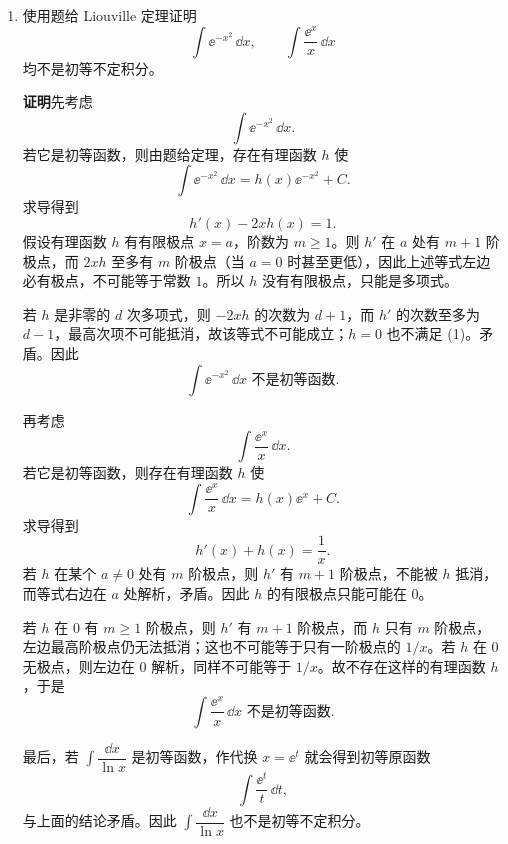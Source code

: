 \begin{enumerate}
  \item 使用题给 Liouville 定理证明
  \[
    \int\ee^{-x^2}\,\dd x,
    \qquad
    \int\frac{\ee^x}{x}\,\dd x
  \]
  均不是初等不定积分。

  \textbf{证明}\quad 先考虑
  \[
    \int\ee^{-x^2}\,\dd x.
  \]
  若它是初等函数，则由题给定理，存在有理函数 $h$ 使
  \[
    \int\ee^{-x^2}\,\dd x=h(x)\ee^{-x^2}+C.
  \]
  求导得到
  \[
    h'(x)-2xh(x)=1.
  \]
  假设有理函数 $h$ 有有限极点 $x=a$，阶数为 $m\ge1$。则 $h'$ 在 $a$ 处有 $m+1$ 阶极点，而 $2xh$ 至多有 $m$ 阶极点（当 $a=0$ 时甚至更低），因此上述等式左边必有极点，不可能等于常数 $1$。所以 $h$ 没有有限极点，只能是多项式。

  若 $h$ 是非零的 $d$ 次多项式，则 $-2xh$ 的次数为 $d+1$，而 $h'$ 的次数至多为 $d-1$，最高次项不可能抵消，故该等式不可能成立；$h=0$ 也不满足 (1)。矛盾。因此
  \[
    \boxed{\int\ee^{-x^2}\,\dd x\text{ 不是初等函数}}.
  \]

  再考虑
  \[
    \int\frac{\ee^x}{x}\,\dd x.
  \]
  若它是初等函数，则存在有理函数 $h$ 使
  \[
    \int\frac{\ee^x}{x}\,\dd x=h(x)\ee^x+C.
  \]
  求导得到
  \[
    h'(x)+h(x)=\frac1x.
  \]
  若 $h$ 在某个 $a\ne0$ 处有 $m$ 阶极点，则 $h'$ 有 $m+1$ 阶极点，不能被 $h$ 抵消，而等式右边在 $a$ 处解析，矛盾。因此 $h$ 的有限极点只能可能在 $0$。

  若 $h$ 在 $0$ 有 $m\ge1$ 阶极点，则 $h'$ 有 $m+1$ 阶极点，而 $h$ 只有 $m$ 阶极点，左边最高阶极点仍无法抵消；这也不可能等于只有一阶极点的 $1/x$。若 $h$ 在 $0$ 无极点，则左边在 $0$ 解析，同样不可能等于 $1/x$。故不存在这样的有理函数 $h$，于是
  \[
    \boxed{\int\frac{\ee^x}{x}\,\dd x\text{ 不是初等函数}}.
  \]

  最后，若 $\int\dfrac{\dd x}{\ln x}$ 是初等函数，作代换 $x=\ee^t$ 就会得到初等原函数
  \[
    \int\frac{\ee^t}{t}\,\dd t,
  \]
  与上面的结论矛盾。因此 $\int\dfrac{\dd x}{\ln x}$ 也不是初等不定积分。
\end{enumerate}
